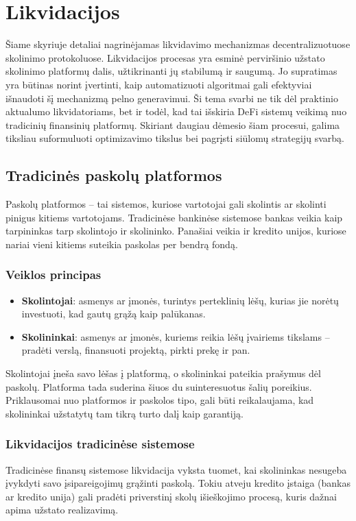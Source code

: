 \documentclass[]{VUMIFTemplateClass}
\begin{document}
\section{Likvidacijos}

Šiame skyriuje detaliai nagrinėjamas likvidavimo mechanizmas decentralizuotuose skolinimo protokoluose. Likvidacijos procesas yra esminė perviršinio užstato skolinimo platformų dalis, užtikrinanti jų stabilumą ir saugumą. Jo supratimas yra būtinas norint įvertinti, kaip automatizuoti algoritmai gali efektyviai išnaudoti šį mechanizmą pelno generavimui. Ši tema svarbi ne tik dėl praktinio aktualumo likvidatoriams, bet ir todėl, kad tai išskiria DeFi sistemų veikimą nuo tradicinių finansinių platformų. Skiriant daugiau dėmesio šiam procesui, galima tiksliau suformuluoti optimizavimo tikslus bei pagrįsti siūlomų strategijų svarbą.

\subsection{Tradicinės paskolų platformos}
Paskolų platformos – tai sistemos, kuriose vartotojai gali skolintis ar skolinti pinigus kitiems vartotojams. Tradicinėse bankinėse sistemose bankas veikia kaip tarpininkas tarp skolintojo ir skolininko. Panašiai veikia ir kredito unijos, kuriose nariai vieni kitiems suteikia paskolas per bendrą fondą. \cite{bankandcreditunioin}

\subsubsection{Veiklos principas}
\begin{itemize}
    \item \textbf{Skolintojai}: asmenys ar įmonės, turintys perteklinių lėšų, kurias jie norėtų investuoti, kad gautų grąžą kaip palūkanas.
    \item \textbf{Skolininkai}: asmenys ar įmonės, kuriems reikia lėšų įvairiems tikslams – pradėti verslą, finansuoti projektą, pirkti prekę ir pan.
\end{itemize}

Skolintojai įneša savo lėšas į platformą, o skolininkai pateikia prašymus dėl paskolų. Platforma tada suderina šiuos du suinteresuotus šalių poreikius. Priklausomai nuo platformos ir paskolos tipo, gali būti reikalaujama, kad skolininkai užstatytų tam tikrą turto dalį kaip garantiją.

\subsubsection{Likvidacijos tradicinėse sistemose}
Tradicinėse finansų sistemose likvidacija vyksta tuomet, kai skolininkas nesugeba įvykdyti savo įsipareigojimų grąžinti paskolą. Tokiu atveju kredito įstaiga (bankas ar kredito unija) gali pradėti priverstinį skolų išieškojimo procesą, kuris dažnai apima užstato realizavimą. \cite{traditionalliquidation}
\end{document}
